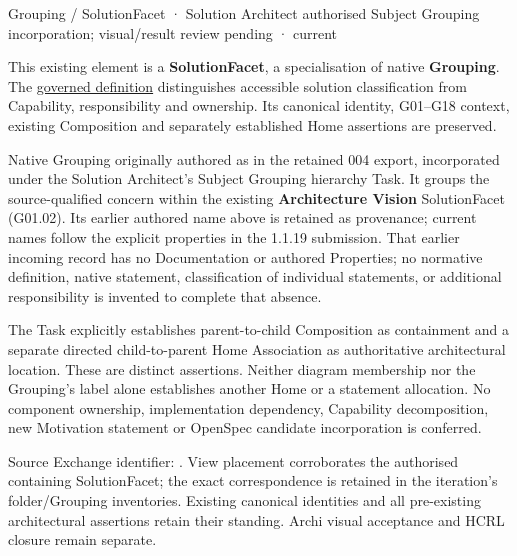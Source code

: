\label{element:b01782f63be44bc9ab2f6ebbf84b37f2}
{\small Grouping / SolutionFacet · Solution Architect authorised Subject Grouping incorporation; visual/result review pending · current}\par

This existing element is a \textbf{SolutionFacet}, a specialisation of native
\textbf{Grouping}. The \href{\detokenize{../../../../../../../governance/continuum-representation.md#solutionfacet-classification--1119-candidate}}{governed definition}
distinguishes accessible solution classification from Capability, responsibility
and ownership. Its canonical identity, G01–G18 context, existing Composition
and separately established Home assertions are preserved.



Native Grouping originally authored as \texttt{} in the retained 004 export,
incorporated under the Solution Architect's Subject Grouping hierarchy Task.
It groups the source-qualified \texttt{} concern within
the existing \textbf{Architecture Vision} SolutionFacet (G01.02). Its earlier authored name above is retained as provenance; current names
follow the explicit properties in the 1.1.19 submission.
That earlier incoming record has no Documentation or authored Properties; no normative
definition, native statement, classification of individual statements, or
additional responsibility is invented to complete that absence.



The Task explicitly establishes parent-to-child Composition as containment and
a separate directed child-to-parent Home Association as authoritative architectural
location. These are distinct assertions. Neither diagram membership nor the
Grouping's label alone establishes another Home or a statement allocation.
No component ownership, implementation dependency, Capability decomposition,
new Motivation statement or OpenSpec candidate incorporation is conferred.



Source Exchange identifier: \texttt{}. View placement corroborates
the authorised containing SolutionFacet; the exact correspondence is retained in the
iteration's folder/Grouping inventories. Existing canonical identities and all
pre-existing architectural assertions retain their standing. Archi visual
acceptance and HCRL closure remain separate.


